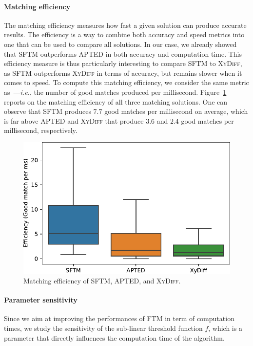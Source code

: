 \paragraph{Matching efficiency}
The matching efficiency measures how fast a given solution can produce accurate results.
The efficiency is a way to combine both accuracy and speed metrics into one that can be used to compare all solutions.
In our case, we already showed that SFTM outperforms APTED in both accuracy and computation time.
This efficiency measure is thus particularly interesting to compare SFTM to \textsc{XyDiff}, as SFTM outperforms \textsc{XyDiff} in terms of accuracy, but remains slower when it comes to speed.
To compute this matching efficiency, we consider the same metric as~\cite{oliveira2018efficient}---\emph{i.e.}, the number of good matches produced per millisecond.
Figure~\ref{sftm:fig:efficiency} reports on the matching efficiency of all three matching solutions.
One can observe that SFTM produces $7.7$ good matches per millisecond on average, which is far above APTED and \textsc{XyDiff} that produce $3.6$ and $2.4$ good matches per millisecond, respectively. 

\begin{figure}
    \centering
    \includegraphics[width=.8\linewidth]{tree-matching/graphs/efficiency}
    \caption{Matching efficiency of SFTM, APTED, and \textsc{XyDiff}.}
    \label{sftm:fig:efficiency}
\end{figure}

\paragraph{Parameter sensitivity}
Since we aim at improving the performances of FTM in term of computation times, we study the sensitivity of the sub-linear threshold function $f$, which is a parameter that directly influences the computation time of the algorithm.

